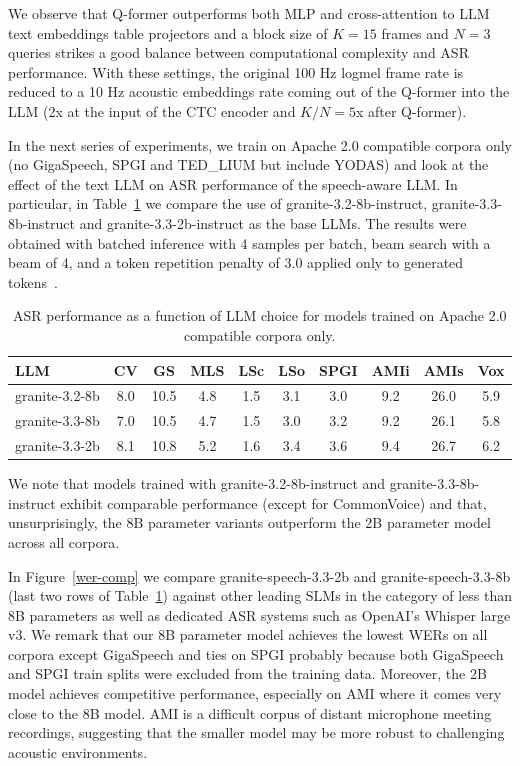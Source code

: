 \documentclass[9pt,conference]{IEEEtran}
\begin{document}
We observe that Q-former outperforms both MLP and cross-attention to LLM text embeddings table projectors and a block size of $K=15$ frames and $N=3$ queries strikes a good balance between computational complexity and ASR performance. With these settings, the original 100 Hz logmel frame rate is reduced to a 10 Hz acoustic embeddings rate coming out of the Q-former into the LLM (2x at the input of the CTC encoder and $K/N=5$x after Q-former). 

In the next series of experiments, we train on Apache 2.0 compatible corpora only (no GigaSpeech, SPGI and TED\_LIUM but include YODAS) and look at the effect of the text LLM on ASR performance of the speech-aware LLM. In particular, in Table~\ref{llm-wer} we compare the use of granite-3.2-8b-instruct, granite-3.3-8b-instruct and granite-3.3-2b-instruct as the base LLMs. The results were obtained with batched inference with 4 samples per batch, beam search with a beam of 4, and a token repetition penalty of 3.0 applied only to generated tokens~\cite{keskar2019ctrl}. 

\begin{table}[htb]
\begin{center}
\begin{tabular}{|l|c|c|c|c|c|c|c|c|c|}\hline
LLM            &  CV  & GS   & MLS & LSc & LSo & SPGI & AMIi & AMIs & Vox \\ \hline
granite-3.2-8b & 8.0  & 10.5 & 4.8 & 1.5 & 3.1 & 3.0  & 9.2  & 26.0 & 5.9 \\ \hline
granite-3.3-8b & 7.0  & 10.5 & 4.7 & 1.5 & 3.0 & 3.2  & 9.2  & 26.1 & 5.8 \\ \hline
granite-3.3-2b & 8.1  & 10.8 & 5.2 & 1.6 & 3.4 & 3.6  & 9.4  & 26.7 & 6.2 \\ \hline
\end{tabular}
\end{center}
\caption{\label{llm-wer}ASR performance as a function of LLM choice for models trained on Apache 2.0 compatible corpora only.}
\end{table}

We note that models trained with granite-3.2-8b-instruct and granite-3.3-8b-instruct exhibit comparable performance (except for CommonVoice) and that, unsurprisingly, the 8B parameter variants outperform the 2B parameter model across all corpora.

In Figure~\ref{wer-comp} we compare granite-speech-3.3-2b and granite-speech-3.3-8b (last two rows of Table~\ref{llm-wer}) against other leading SLMs in the category of less than 8B parameters as well as dedicated ASR systems such as OpenAI's Whisper large v3. We remark that our 8B parameter model achieves the lowest WERs on all corpora except GigaSpeech and ties on SPGI probably because both GigaSpeech and SPGI train splits were excluded from the training data. Moreover, the 2B model achieves competitive performance, especially on AMI where it comes very close to the 8B model. AMI is a difficult corpus of distant microphone meeting recordings, suggesting that the smaller model may be more robust to challenging acoustic environments. 
 
\end{document}
